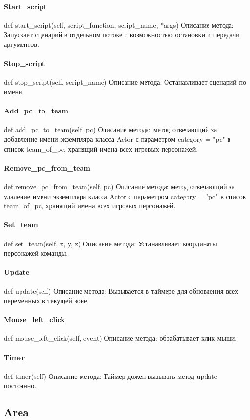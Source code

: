 \paragraph{Start\_script}
def start\_script(self, script\_function, script\_name, *args)
Описание метода: Запускает сценарий в отдельном потоке с возможностью остановки и передачи аргументов.
\paragraph{Stop\_script}
def stop\_script(self, script\_name)
Описание метода: Останавливает сценарий по имени.
\paragraph{Add\_pc\_to\_team}
def add\_pc\_to\_team(self, pc)
Описание метода: метод отвечающий за добавление имени экземпляра класса Actor с параметром category = "pc" в список team\_of\_pc, хранящий имена всех игровых персонажей.
\paragraph{Remove\_pc\_from\_team}
def remove\_pc\_from\_team(self, pc)
Описание метода: метод отвечающий за удаление имени экземпляра класса Actor с параметром category = "pc" в список team\_of\_pc, хранящий имена всех игровых персонажей.
\paragraph{Set\_team}
def set\_team(self, x, y, z)
Описание метода: Устанавливает координаты персонажей команды.
\paragraph{Update}
def update(self)
Описание метода: Вызывается в таймере для обновления всех переменных в текущей зоне.
\paragraph{Mouse\_left\_click}
def mouse\_left\_click(self, event)
Описание метода: обрабатывает клик мыши.
\paragraph{Timer}
def timer(self)
Описание метода: Таймер дожен вызывать метод update постоянно.


\subsection{Area}
